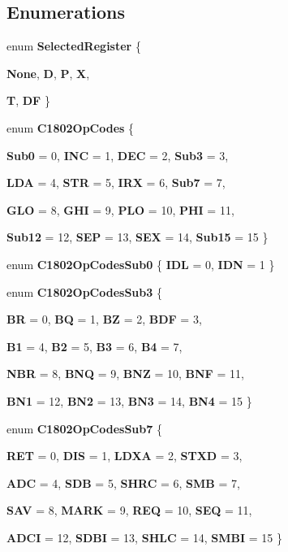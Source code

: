 \subsection*{Enumerations}
\begin{DoxyCompactItemize}
\item 
enum {\bfseries SelectedRegister} \{ \par
{\bfseries None}, 
{\bfseries D}, 
{\bfseries P}, 
{\bfseries X}, 
\par
{\bfseries T}, 
{\bfseries DF}
 \}
\item 
enum {\bfseries C1802OpCodes} \{ \par
{\bfseries Sub0} =  0, 
{\bfseries INC} =  1, 
{\bfseries DEC} =  2, 
{\bfseries Sub3} =  3, 
\par
{\bfseries LDA} =  4, 
{\bfseries STR} =  5, 
{\bfseries IRX} =  6, 
{\bfseries Sub7} =  7, 
\par
{\bfseries GLO} =  8, 
{\bfseries GHI} =  9, 
{\bfseries PLO} =  10, 
{\bfseries PHI} =  11, 
\par
{\bfseries Sub12} =  12, 
{\bfseries SEP} =  13, 
{\bfseries SEX} =  14, 
{\bfseries Sub15} =  15
 \}
\item 
enum {\bfseries C1802OpCodesSub0} \{ {\bfseries IDL} =  0, 
{\bfseries IDN} =  1
 \}
\item 
enum {\bfseries C1802OpCodesSub3} \{ \par
{\bfseries BR} =  0, 
{\bfseries BQ} =  1, 
{\bfseries BZ} =  2, 
{\bfseries BDF} =  3, 
\par
{\bfseries B1} =  4, 
{\bfseries B2} =  5, 
{\bfseries B3} =  6, 
{\bfseries B4} =  7, 
\par
{\bfseries NBR} =  8, 
{\bfseries BNQ} =  9, 
{\bfseries BNZ} =  10, 
{\bfseries BNF} =  11, 
\par
{\bfseries BN1} =  12, 
{\bfseries BN2} =  13, 
{\bfseries BN3} =  14, 
{\bfseries BN4} =  15
 \}
\item 
enum {\bfseries C1802OpCodesSub7} \{ \par
{\bfseries RET} =  0, 
{\bfseries DIS} =  1, 
{\bfseries LDXA} =  2, 
{\bfseries STXD} =  3, 
\par
{\bfseries ADC} =  4, 
{\bfseries SDB} =  5, 
{\bfseries SHRC} =  6, 
{\bfseries SMB} =  7, 
\par
{\bfseries SAV} =  8, 
{\bfseries MARK} =  9, 
{\bfseries REQ} =  10, 
{\bfseries SEQ} =  11, 
\par
{\bfseries ADCI} =  12, 
{\bfseries SDBI} =  13, 
{\bfseries SHLC} =  14, 
{\bfseries SMBI} =  15
 \}
\item 

\end{DoxyCompactItemize}
